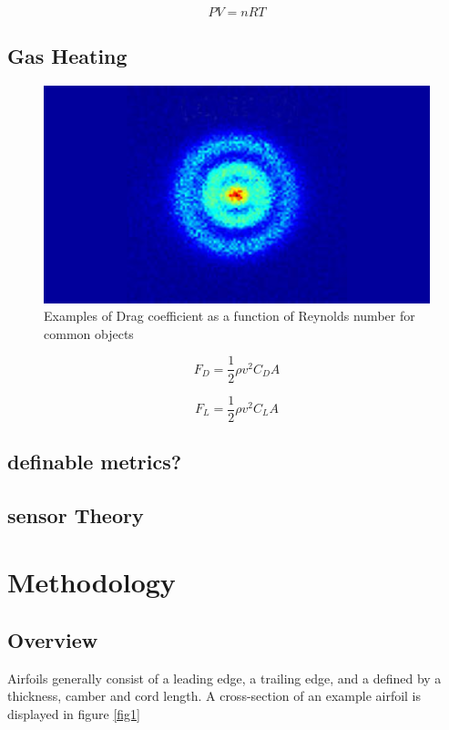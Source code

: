 \documentclass[paper=a4, fontsize=11pt, abstract=on]{scrartcl}
\numberwithin{equation}{section}		%
\numberwithin{figure}{section}			%
\numberwithin{table}{section}				%
\begin{document}
\begin{equation}
\label{ideal}
PV= nRT
\end{equation}

\subsection{Gas Heating}

\begin{figure}[H]
\centering
\includegraphics[width=0.8\linewidth]{hyd}
\caption{Examples of Drag coefficient as a function of Reynolds number for common objects}
\label{comp}
\end{figure}

 \begin{equation}
\label{drag}
F_D= \frac{1}{2}\rho v^2C_DA
\end{equation}


 \begin{equation}
\label{lift}
F_L= \frac{1}{2}\rho v^2C_LA
\end{equation}

\subsection{definable metrics?}


\subsection{sensor Theory}

\section{Methodology}

\subsection{Overview}
Airfoils generally consist of a leading edge, a trailing edge, and a defined by a thickness, camber and cord length. A cross-section of an example airfoil is displayed in figure \ref{fig1}
\end{document}
